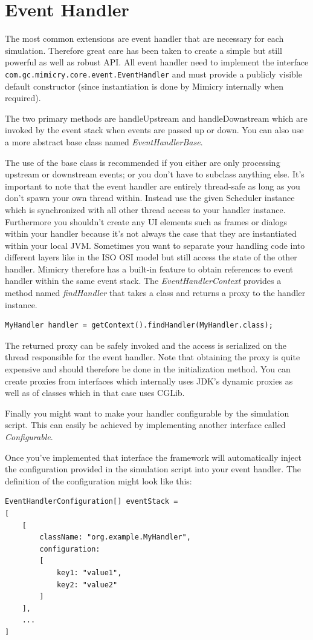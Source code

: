 \documentclass[a4paper,oneside]{book}
\begin{document}
\section{Event Handler}
The most common extensions are event handler that are necessary for each simulation. Therefore great care has been taken to create a simple but still powerful as well as robust API.
All event handler need to implement the interface \texttt{com.gc.mimicry.core.event.EventHandler} and must provide a publicly visible default constructor (since instantiation is done by Mimicry internally when required).

The two primary methods are handleUpstream and handleDownstream which are invoked by the event stack when events are passed up or down. You can also use a more abstract base class named \textit{EventHandlerBase}.

The use of the base class is recommended if you either are only processing upstream or downstream events; or you don't have to subclass anything else.
It's important to note that the event handler are entirely thread-safe as long as you don't spawn your own thread within. Instead use the given Scheduler instance which is synchronized with all other thread access to your handler instance. Furthermore you shouldn't create any UI elements such as frames or dialogs within your handler because it's not always the case that they are instantiated within your local JVM.
Sometimes you want to separate your handling code into different layers like in the ISO OSI model but still access the state of the other handler. Mimicry therefore has a built-in feature to obtain references to event handler within the same event stack. The \textit{EventHandlerContext} provides a method named \textit{findHandler} that takes a class and returns a proxy to the handler instance.
\begin{lstlisting}
MyHandler handler = getContext().findHandler(MyHandler.class);
\end{lstlisting}
The returned proxy can be safely invoked and the access is serialized on the thread responsible for the event handler. Note that obtaining the proxy is quite expensive and should therefore be done in the initialization method.
You can create proxies from interfaces which internally uses JDK's dynamic proxies as well as of classes which in that case uses CGLib.

Finally you might want to make your handler configurable by the simulation script. This can easily be achieved by implementing another interface called \textit{Configurable}.

Once you've implemented that interface the framework will automatically inject the configuration provided in the simulation script into your event handler. The definition of the configuration might look like this:
\begin{lstlisting}
EventHandlerConfiguration[] eventStack = 
[
	[
		className: "org.example.MyHandler",
		configuration: 
		[
			key1: "value1",
			key2: "value2"
		]
	],
	...
]
\end{lstlisting}
\end{document}
